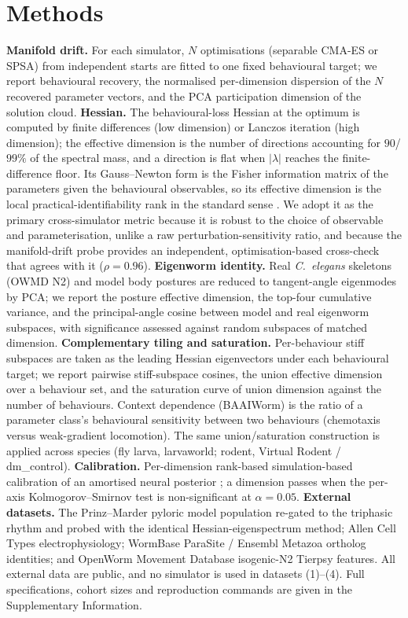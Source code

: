 \documentclass[11pt]{article}
\begin{document}
\section*{Methods}
\textbf{Manifold drift.} For each simulator, $N$ optimisations (separable CMA-ES or SPSA) from independent starts are fitted to one fixed behavioural target; we report behavioural recovery, the normalised per-dimension dispersion of the $N$ recovered parameter vectors, and the PCA participation dimension of the solution cloud. \textbf{Hessian.} The behavioural-loss Hessian at the optimum is computed by finite differences (low dimension) or Lanczos iteration (high dimension); the effective dimension is the number of directions accounting for $90$/$99\%$ of the spectral mass, and a direction is flat when $|\lambda|$ reaches the finite-difference floor. Its Gauss--Newton form is the Fisher information matrix of the parameters given the behavioural observables, so its effective dimension is the local practical-identifiability rank in the standard sense \citep{villaverde2014reverse,gutenkunst2007universally}. We adopt it as the primary cross-simulator metric because it is robust to the choice of observable and parameterisation, unlike a raw perturbation-sensitivity ratio, and because the manifold-drift probe provides an independent, optimisation-based cross-check that agrees with it ($\rho{=}0.96$). \textbf{Eigenworm identity.} Real \emph{C.~elegans} skeletons (OWMD N2) and model body postures are reduced to tangent-angle eigenmodes by PCA; we report the posture effective dimension, the top-four cumulative variance, and the principal-angle cosine between model and real eigenworm subspaces, with significance assessed against random subspaces of matched dimension. \textbf{Complementary tiling and saturation.} Per-behaviour stiff subspaces are taken as the leading Hessian eigenvectors under each behavioural target; we report pairwise stiff-subspace cosines, the union effective dimension over a behaviour set, and the saturation curve of union dimension against the number of behaviours. Context dependence (BAAIWorm) is the ratio of a parameter class's behavioural sensitivity between two behaviours (chemotaxis versus weak-gradient locomotion). The same union/saturation construction is applied across species (fly larva, larvaworld; rodent, Virtual Rodent / dm\_control). \textbf{Calibration.} Per-dimension rank-based simulation-based calibration \citep{talts2018validating,hermans2022sbc} of an amortised neural posterior \citep{papamakarios2016mdn,deistler2022truncated}; a dimension passes when the per-axis Kolmogorov--Smirnov test is non-significant at $\alpha{=}0.05$. \textbf{External datasets.} The Prinz--Marder pyloric model population re-gated to the triphasic rhythm and probed with the identical Hessian-eigenspectrum method; Allen Cell Types electrophysiology; WormBase ParaSite / Ensembl Metazoa ortholog identities; and OpenWorm Movement Database isogenic-N2 Tierpsy features. All external data are public, and no simulator is used in datasets (1)--(4). Full specifications, cohort sizes and reproduction commands are given in the Supplementary Information.
\end{document}
